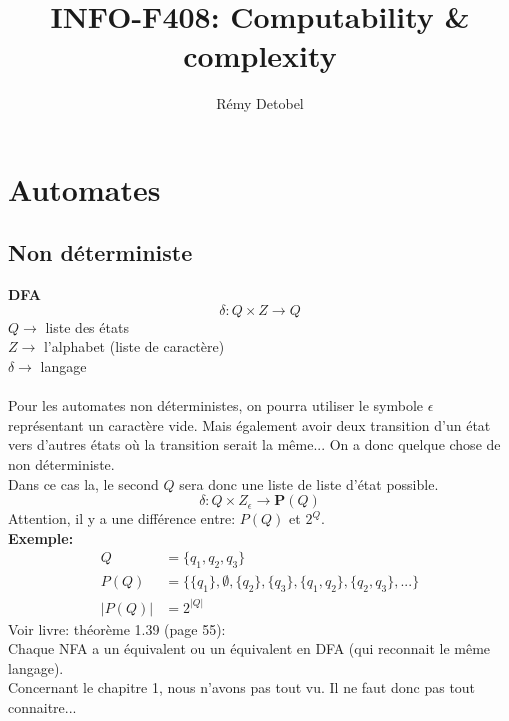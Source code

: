 \documentclass[a4paper,12pt]{article}
\title{INFO-F408: Computability \& complexity}
\author{Rémy Detobel}
\begin{document}
\maketitle
\newpage

\section{Automates}
  \subsection{Non déterministe}
    \textbf{DFA}
    $$\delta : Q \times Z \rightarrow Q$$
    $Q \rightarrow$ liste des états\\
    $Z \rightarrow$ l'alphabet (liste de caractère)\\
    $\delta \rightarrow$ langage\\
    \\
    Pour les automates non déterministes, on pourra utiliser le symbole $\epsilon$ représentant un caractère vide.  Mais également avoir deux transition d'un état vers d'autres états où la transition serait la même...  On a donc quelque chose de non déterministe.\\
    Dans ce cas la, le second $Q$ sera donc une liste de liste d'état possible.\\
    $$\delta : Q \times Z_{\epsilon} \rightarrow \bm{P}(Q)$$
    Attention, il y a une différence entre: $P(Q)$ et $2^Q$.\\
    \textbf{Exemple:}\\
    \begin{align*}
      Q &= \{q_1, q_2, q_3\}\\
      P(Q) &= \{\{q_1\}, \emptyset, \{q_2\}, \{q_3\}, \{q_1, q_2\}, \{q_2, q_3\}, ...\}\\
      |P(Q)| &= 2^{|Q|}
    \end{align*}
    Voir livre: théorème 1.39 (page 55):\\
    Chaque NFA a un équivalent ou un équivalent en DFA (qui reconnait le même langage).\\
    Concernant le chapitre 1, nous n'avons pas tout vu. Il ne faut donc pas tout connaitre...
    
\end{document}
